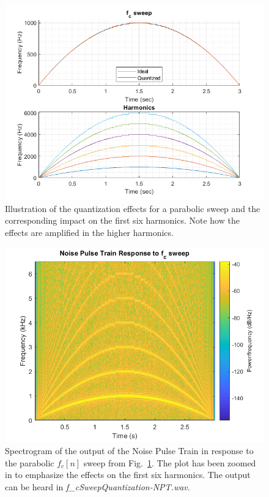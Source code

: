 \documentclass[../main.tex]{subfiles}
\begin{document}
\begin{figure}[h]
    \centering
    \includegraphics[scale=.62]{./images/plots/f_cSweepQuantized.png}
    \caption{Illustration of the quantization effects for a parabolic sweep and the corresponding impact on the first six harmonics. Note how the effects are amplified in the higher harmonics.}
    \label{fig:f_cSweepQuantized}
\end{figure}

\clearpage

\begin{figure}[h]
    \centering
    \includegraphics[scale=.65]{./images/plots/f_cSweepNPT.png}
    \caption{Spectrogram of the output of the Noise Pulse Train in response to the parabolic $f_c[n]$ sweep from Fig.~\ref{fig:f_cSweepQuantized}. The plot has been zoomed in to emphasize the effects on the first six harmonics. The output can be heard in \emph{f\_cSweepQuantization-NPT.wav}.}
    \label{fig:f_cQuantizedSpectrum}
\end{figure}
\end{document}
